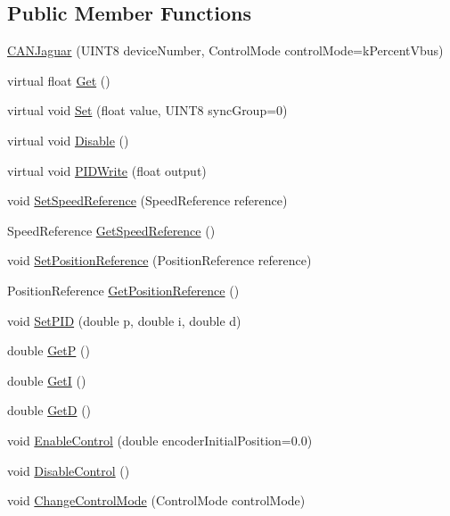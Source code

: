 \subsection*{Public Member Functions}
\begin{DoxyCompactItemize}
\item 
\hyperlink{classCANJaguar_a340969dc13d677bc2d5e35aa7f7b5138}{CANJaguar} (UINT8 deviceNumber, ControlMode controlMode=kPercentVbus)
\item 
virtual float \hyperlink{classCANJaguar_a35f28a93acc83bcc482d481037389433}{Get} ()
\item 
virtual void \hyperlink{classCANJaguar_aa8a4f32b3c1839557cd73996693a116a}{Set} (float value, UINT8 syncGroup=0)
\item 
virtual void \hyperlink{classCANJaguar_a3dc0852859fb60499b609938b69e9252}{Disable} ()
\item 
virtual void \hyperlink{classCANJaguar_a2355d55f42083ab82870c79f742620e4}{PIDWrite} (float output)
\item 
void \hyperlink{classCANJaguar_a581f44af48079151da32f6399e196c33}{SetSpeedReference} (SpeedReference reference)
\item 
SpeedReference \hyperlink{classCANJaguar_acdfbc905e87b675f4fbe94145fbe341a}{GetSpeedReference} ()
\item 
void \hyperlink{classCANJaguar_ae99bbad1a99dcdd8f4620e4cc99705bf}{SetPositionReference} (PositionReference reference)
\item 
PositionReference \hyperlink{classCANJaguar_af123f5fb0996d8992b7fd8f5a778c56d}{GetPositionReference} ()
\item 
void \hyperlink{classCANJaguar_ae6650f4f7aea62f9df00056076b3d462}{SetPID} (double p, double i, double d)
\item 
double \hyperlink{classCANJaguar_aba0dd36ac9faff31d16f78490edbe85d}{GetP} ()
\item 
double \hyperlink{classCANJaguar_affd66787becba69c8f9e5ffcb11f7ba1}{GetI} ()
\item 
double \hyperlink{classCANJaguar_ab8ddc893fde5f16e0c76684593c20758}{GetD} ()
\item 
void \hyperlink{classCANJaguar_af25bed87c7d97429b0472b52f92b186e}{EnableControl} (double encoderInitialPosition=0.0)
\item 
void \hyperlink{classCANJaguar_a6bbbf784a74cf95f7b4a5660a3d53cc2}{DisableControl} ()
\item 
void \hyperlink{classCANJaguar_ababe0fdb6bdab82c95dcb9c0a9b660d0}{ChangeControlMode} (ControlMode controlMode)

\end{DoxyCompactItemize}
